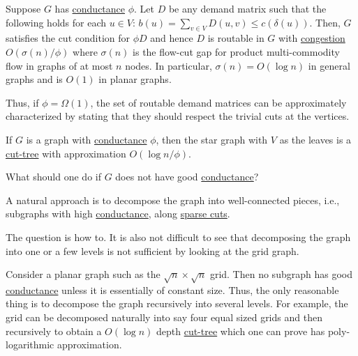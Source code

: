 \begin{claim}
	Suppose \(G\) has \hyperref[def:conductance]{conductance} \(\phi \). Let \(D\) be any demand matrix such that the following holds for each \(u \in V\): \(b(u) = \sum_{v \in V} D(u, v) \leq c(\delta (u))\). Then, \(G\) satisfies the cut condition for \(\phi D\) and hence \(D\) is routable in \(G\) with \hyperref[def:congestion]{congestion} \(O(\sigma (n) / \phi )\) where \(\sigma (n)\) is the flow-cut gap for product multi-commodity flow in graphs of at most \(n\) nodes. In particular, \(\sigma (n) = O(\log n)\) in general graphs and is \(O(1)\) in planar graphs.
\end{claim}

Thus, if \(\phi = \Omega (1)\), the set of routable demand matrices can be approximately characterized by stating that they should respect the trivial cuts at the vertices.

\begin{eg}[Expander]
	If \(G\) is a graph with \hyperref[def:conductance]{conductance} \(\phi \), then the star graph with \(V\) as the leaves is a \hyperref[def:cut-tree]{cut-tree} with approximation \(O(\log n / \phi )\).
	\begin{center}
	\end{center}
\end{eg}

What should one do if \(G\) does not have good \hyperref[def:conductance]{conductance}?

\begin{intuition}
	A natural approach is to decompose the graph into well-connected pieces, i.e., subgraphs with high \hyperref[def:conductance]{conductance}, along \hyperref[prb:sparsest-cut]{sparse cuts}.
\end{intuition}

The question is how to. It is also not difficult to see that decomposing the graph into one or a few levels is not sufficient by looking at the grid graph.

\begin{eg}[Grid]
	Consider a planar graph such as the \(\sqrt{n} \times \sqrt{n} \) grid. Then no subgraph has good \hyperref[def:conductance]{conductance} unless it is essentially of constant size. Thus, the only reasonable thing is to decompose the graph recursively into several levels. For example, the grid can be decomposed naturally into say four equal sized grids and then recursively to obtain a \(O(\log n)\) depth \hyperref[def:cut-tree]{cut-tree} which one can prove has poly-logarithmic approximation.
	\begin{center}
	\end{center}
\end{eg}

